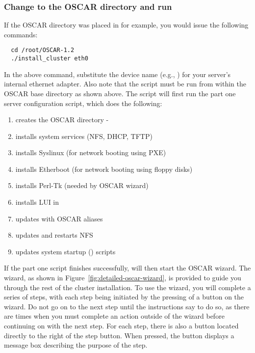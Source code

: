 \subsubsection{Change to the OSCAR directory and run }

\begchange
If the OSCAR directory was placed in  for example, you
would issue the following commands:

\begin{verbatim}
  cd /root/OSCAR-1.2
  ./install_cluster eth0
\end{verbatim}
\endchange
  
\begchange
In the above command, substitute the device name 
\endchange
(e.g., )
for your server's internal ethernet adapter. Also note that the
 script must be run from within the OSCAR base
directory as shown above. The script will first run the part one
server configuration script, which does the following:

\begin{enumerate}
\item creates the OSCAR directory - 
\item installs system services (NFS, DHCP, TFTP)
\item installs Syslinux (for network booting using PXE)
\item installs Etherboot (for network booting using floppy disks)
\item installs Perl-Tk (needed by OSCAR wizard)
\item installs LUI in 
\item updates  with OSCAR aliases
\item updates  and restarts NFS
\item updates system startup () scripts
\end{enumerate}
  
If the part one script finishes successfully, 
will then start the OSCAR wizard. The wizard, as shown in
Figure~\ref{fig:detailed-oscar-wizard}, is provided to guide you
through the rest of the cluster installation.  To use the wizard, you
will complete a series of steps, with each step being initiated by the
pressing of a button on the wizard. Do not go on to the next step
until the instructions say to do so, as there are times when you must
complete an action outside of the wizard before continuing on with the
next step. For each step, there is also a  button located
directly to the right of the step button. When pressed, the
 button displays a message box describing the purpose of
the step.

